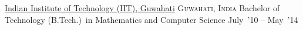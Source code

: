 \documentclass[10pt,a4paper]{article}
\begin{document}

\headedsection
  {\href{}{Indian Institute of Technology (IIT), Guwahati}}
  {\textsc{Guwahati, India}} {%
  \headedsubsection
    {Bachelor of Technology (B.Tech.)~in Mathematics and Computer Science}
    {July~'10 -- May~'14} {}
}


	

\spacedhrule{0.5em}{-0.4em}

\vspace{0.15cm}
\end{document}
